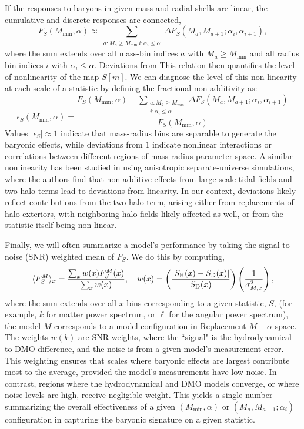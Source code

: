 \documentclass[linenumbers,trackchanges]{aastex701}
\begin{document}
If the responses to baryons in given mass and radial shells are linear, the cumulative and discrete responses are connected,
\begin{equation}\label{eq:additive_approx}
F_S(M_{\min}, \alpha) \approx \sum_{\substack{a: M_a \geq M_{\min} \
i: \alpha_i \leq \alpha}}
\Delta F_S(M_a, M_{a+1}; \alpha_i, \alpha_{i+1}),
\end{equation}
where the sum extends over all mass-bin indices $a$ with $M_a \geq M_{\min}$
and all radius bin indices $i$ with $\alpha_i \leq \alpha$. Deviations from
This relation then quantifies the level of nonlinearity of the map $S[m]$. We can diagnose the level of this non-linearity at each scale of a statistic by defining the fractional non-additivity as:
\begin{equation}\label{eq:non_additivity}
\epsilon_S(M_{\min}, \alpha) = \dfrac{F_S(M_{\min}, \alpha) -
\sum_{\substack{a: M_a \geq M_{\min} \\ i: \alpha_i \leq \alpha}}
\Delta F_S(M_a, M_{a+1}; \alpha_i, \alpha_{i+1})}{F_S(M_{\min}, \alpha)}
\end{equation}
Values $|\epsilon_S| \approx 1$ indicate that mass-radius bins are separable to generate the baryonic effects, while deviations from $1$ indicate nonlinear
interactions or correlations between different regions of mass radius parameter space. A similar nonlinearity has been studied in \citep{Masaki20} using anisotropic separate-universe simulations, where the authors find that non-additive effects from large-scale tidal fields and two-halo terms lead to deviations from linearity. In our context, deviations likely reflect contributions from the two-halo term, arising either from replacements of halo exteriors, with neighboring halo fields likely affected as well, or from the statistic itself being non-linear.

Finally, we will often summarize a model's performance by taking the signal-to-noise (SNR) weighted mean of $F_S$. We do this by computing,
\begin{equation}
\label{eq:weighted_mean_response}
\langle F^M_S \rangle_x = \frac{\sum_x w(x) F^M_S(x)}{\sum_x w(x)}, \quad w(x) = \left(\frac{|S_{\rm H}(x) - S_{\rm D}(x)|}{S_{\rm D}(x)}\right)\left(\dfrac{1}{\sigma_{M,x}^2}\right),
\end{equation}
where the sum extends over all $x$-bins corresponding to a given statistic, $S$, (for example, $k$ for matter power spectrum, or $\ell$ for the angular power spectrum), the model $M$ corresponds to a model configuration in Replacement $M-\alpha$ space. The weights $w(k)$ are SNR-weights, where the ``signal" is the hydrodynamical to DMO difference, and the noise is from a given model’s measurement error. This weighting ensures that scales where baryonic effects are largest contribute most to the average, provided the model's measurements have low noise. In contrast, regions where the hydrodynamical and DMO models converge, or where noise levels are high, receive negligible weight. This yields a single number summarizing the overall effectiveness of a given $(M_{\min}, \alpha)$ or $(M_a, M_{a+1}; \alpha_i)$ configuration in capturing the baryonic signature on a given statistic.
\end{document}
